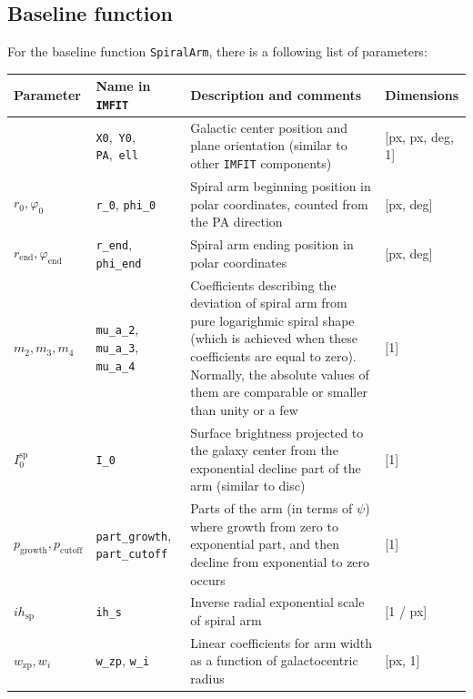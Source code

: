 \documentclass[12pt,a4paper]{article}
\begin{document}
\begin{table}[h]
\subsection{Baseline function}
For the baseline function \verb*|SpiralArm|, there is a following list of parameters:\\
\begin{tabularx}{\textwidth}{|L{0.6}|L{0.6}|L{1.8}|l|}
	\hline
	Parameter & Name in \verb*|IMFIT| & Description and comments & Dimensions \\
	\hline
	& \verb*|X0|,~\verb*|Y0|, \verb*|PA|,~\verb*|ell| &  Galactic center position and plane orientation (similar to other \verb*|IMFIT| components) & [px, px, deg, 1] \\
	\hline
	$r_0, \varphi_0$ & \verb*|r_0|, \verb*|phi_0| & Spiral arm beginning position in polar coordinates, counted from the PA direction & [px, deg] \\
	\hline
	$r_\text{end}, \varphi_\text{end}$ & \verb*|r_end|, \verb*|phi_end| & Spiral arm ending position in polar coordinates & [px, deg] \\
	\hline
	$m_2, m_3, m_4$ & \verb*|mu_a_2|, \verb*|mu_a_3|, \verb*|mu_a_4| & Coefficients describing the deviation of spiral arm from pure logarighmic spiral shape (which is achieved when these coefficients are equal to zero). Normally, the absolute values of them are comparable or smaller than unity or a few & [1] \\
	\hline
	$I^\text{sp}_0$ & \verb*|I_0| & Surface brightness projected to the galaxy center from the exponential decline part of the arm (similar to disc) & [1] \\
	\hline
	$p_\text{growth}, p_\text{cutoff}$ & \verb*|part_growth|, \verb*|part_cutoff| & Parts of the arm (in terms of $\psi$) where growth from zero to exponential part, and then decline from exponential to zero occurs & [1] \\
	\hline
	$ih_\text{sp}$ & \verb*|ih_s| & Inverse radial exponential scale of spiral arm & [1 / px] \\
	\hline
	$w_\text{zp}, w_i$ & \verb*|w_zp|, \verb*|w_i| & Linear coefficients for arm width as a function of galactocentric radius & [px, 1] \\
	\hline
\end{tabularx}
\end{table}
\end{document}
